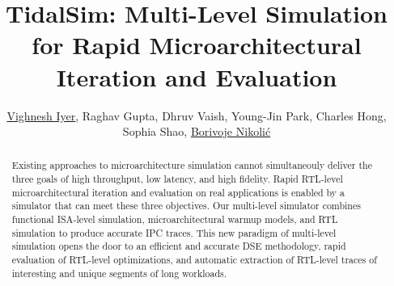 \documentclass[sigplan,nonacm,10pt]{acmart}
\begin{document}
\title{TidalSim: Multi-Level Simulation for Rapid Microarchitectural Iteration and Evaluation}


\author{\href{https://orcid.org/0000-0001-6934-6577}{Vighnesh Iyer}, Raghav Gupta, Dhruv Vaish, Young-Jin Park, Charles Hong, Sophia Shao, \href{https://orcid.org/0000-0003-2324-1715}{Borivoje Nikolić}}



\renewcommand{\shortauthors}{Iyer, Vighnesh et al.}

\begin{abstract}

Existing approaches to microarchitecture simulation cannot simultaneouly deliver the three goals of high throughput, low latency, and high fidelity.
Rapid RTL-level microarchitectural iteration and evaluation on real applications is enabled by a simulator that can meet these three objectives.
Our multi-level simulator combines functional ISA-level simulation, microarchitectural warmup models, and RTL simulation to produce accurate IPC traces.
This new paradigm of multi-level simulation opens the door to an efficient and accurate DSE methodology, rapid evaluation of RTL-level optimizations, and automatic extraction of RTL-level traces of interesting and unique segments of long workloads.

\end{abstract}

\end{document}
